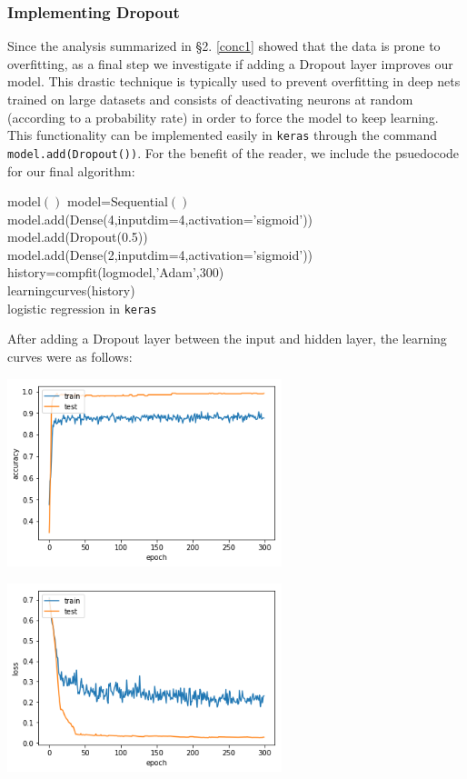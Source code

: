 \documentclass[14pt]{article}
\theoremstyle{plain}
\theoremstyle{definition}
\newcommand{\un}{\textunderscore}
\begin{document}
\subsubsection{Implementing Dropout} Since the analysis summarized in \S 2. \ref{conc1} showed that the data is prone to overfitting, as a final step we investigate if adding a Dropout layer improves our model. This drastic technique is typically used to prevent overfitting in deep nets trained on large datasets and consists of deactivating neurons at random (according to a probability rate) in order to force the model to keep learning. This functionality can be implemented easily in \texttt{keras} through the command \texttt{model.add(Dropout())}.  For the benefit of the reader, we include the psuedocode for our final algorithm:
\begin{algorithm}
	model$()$\;
    model=Sequential$()$\\
	model.add(Dense(4,input\un dim=4,activation='sigmoid'))\\
	model.add(Dropout(0.5))\\
	model.add(Dense(2,input\un dim=4,activation='sigmoid'))
	history=comp\un fit(logmodel,'Adam',300)\\
	learning\un curves(history)\\
   \caption{logistic regression in \texttt{keras} }
\end{algorithm}


After adding a Dropout layer between the input and hidden layer, the learning curves were as follows:
\begin{table}[ht]
\begin{minipage}[b]{0.3\linewidth}
\centering
\includegraphics[width=80mm]{banknote_forgery_files/dropout_1}
\end{minipage}\hfill
\begin{minipage}[b]{0.5\linewidth}
\centering
\includegraphics[width=80mm]{banknote_forgery_files/dropout_2}
\end{minipage}
\end{table}
\end{document}
